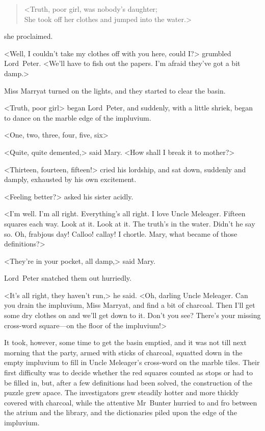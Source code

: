 \begin{quote}
<Truth, poor girl, was nobody's daughter;\\
She took off her clothes and jumped into the water.>
\end{quote}
she proclaimed.

<Well, I couldn't take my clothes off with you here, could I\@?> grumbled Lord~Peter. <We'll have to fish out the papers. I'm afraid they've got a bit damp.>

Miss Marryat turned on the lights, and they started to clear the basin.

<Truth, poor girl\longdash> began Lord~Peter, and suddenly, with a little shriek, began to dance on the marble edge of the impluvium.

<One, two, three, four, five, six\longdash>

<Quite, quite demented,> said Mary. <How shall I break it to mother?>

<Thirteen, fourteen, fifteen!> cried his lordship, and sat down, suddenly and damply, exhausted by his own excitement.

<Feeling better?> asked his sister acidly.

<I'm well. I'm all right. Everything's all right. I love Uncle Meleager. Fifteen squares each way. Look at it. Look at it. The truth's in the water. Didn't he say so. Oh, frabjous day! Calloo! callay! I chortle. Mary, what became of those definitions?>

<They're in your pocket, all damp,> said Mary.

Lord~Peter snatched them out hurriedly.

<It's all right, they haven't run,> he said. <Oh, darling Uncle Meleager. Can you drain the impluvium, Miss Marryat, and find a bit of charcoal. Then I'll get some dry clothes on and we'll get down to it. Don't you see? There's your missing cross-word square—on the floor of the impluvium!>

It took, however, some time to get the basin emptied, and it was not till next morning that the party, armed with sticks of charcoal, squatted down in the empty impluvium to fill in Uncle Meleager's cross-word on the marble tiles. Their first difficulty was to decide whether the red squares counted as stops or had to be filled in, but, after a few definitions had been solved, the construction of the puzzle grew apace. The investigators grew steadily hotter and more thickly covered with charcoal, while the attentive Mr~Bunter hurried to and fro between the atrium and the library, and the dictionaries piled upon the edge of the impluvium.

